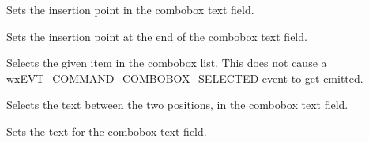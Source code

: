 


\label{wxcomboboxsetinsertionpoint}


Sets the insertion point in the combobox text field.



\label{wxcomboboxsetinsertionpointend}


Sets the insertion point at the end of the combobox text field.

\label{wxcomboboxsetselection}


Selects the given item in the combobox list. This does not cause a
wxEVT\_COMMAND\_COMBOBOX\_SELECTED event to get emitted.


Selects the text between the two positions, in the combobox text field.





\label{wxcomboboxsetvalue}


Sets the text for the combobox text field.




